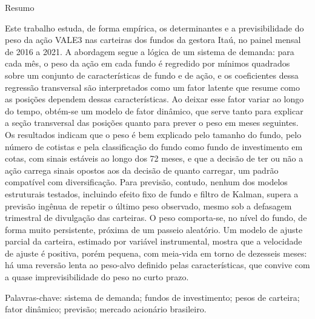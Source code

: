 \documentclass[12pt,a4paper]{article}
\begin{document}
\thispagestyle{fancy}
\begin{center}{\large Resumo}\end{center}
\noindent
Este trabalho estuda, de forma empírica, os determinantes e a previsibilidade do peso da
ação VALE3 nas carteiras dos fundos da gestora Itaú, no painel mensal de 2016 a 2021.
A abordagem segue a lógica de um sistema de demanda: para cada mês, o peso da ação em
cada fundo é regredido por mínimos quadrados sobre um conjunto de características de fundo
e de ação, e os coeficientes dessa regressão transversal são interpretados como um fator
latente que resume como as posições dependem dessas características. Ao deixar esse fator
variar ao longo do tempo, obtém-se um modelo de fator dinâmico, que serve tanto para
explicar a seção transversal das posições quanto para prever o peso em meses seguintes.
Os resultados indicam que o peso é bem explicado pelo tamanho do fundo, pelo número de
cotistas e pela classificação do fundo como fundo de investimento em cotas, com sinais
estáveis ao longo dos 72 meses, e que a decisão de ter ou não a ação carrega sinais
opostos aos da decisão de quanto carregar, um padrão compatível com diversificação. Para
previsão, contudo, nenhum dos modelos estruturais testados, incluindo efeito fixo de fundo
e filtro de Kalman, supera a previsão ingênua de repetir o último peso observado, mesmo sob
a defasagem trimestral de divulgação das carteiras. O peso comporta-se, no nível do fundo,
de forma muito persistente, próxima de um passeio aleatório. Um modelo de ajuste parcial da
carteira, estimado por variável instrumental, mostra que a velocidade de ajuste é positiva,
porém pequena, com meia-vida em torno de dezesseis meses: há uma reversão lenta ao peso-alvo
definido pelas características, que convive com a quase imprevisibilidade do peso no curto prazo.

\smallskip
\noindent Palavras-chave: sistema de demanda; fundos de investimento; pesos de carteira;
fator dinâmico; previsão; mercado acionário brasileiro.
\end{document}
